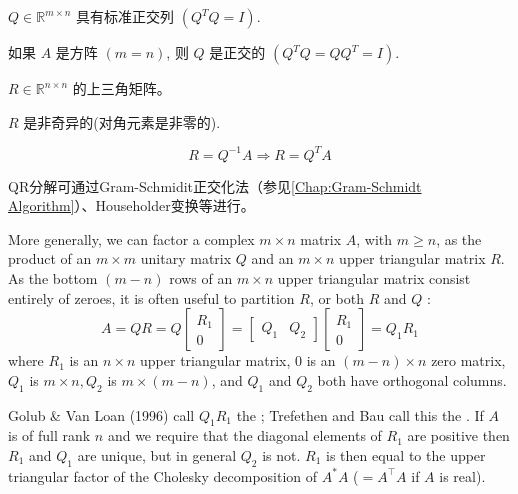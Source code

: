 \begin{corollary}
    $ Q \in \mathbb{R}^{m \times n} $ 具有标准正交列 $ \left(Q^{T} Q=I\right) $.
\end{corollary}

\begin{corollary}
    如果 $ A $ 是方阵 $ ( {m}= {n}) $, 则 $ Q $ 是正交的 $ \left(Q^{T} Q=Q Q^{T}=I\right) $.
\end{corollary}

\begin{corollary}
    $ R \in \mathbb{R}^{n \times n} $ 的上三角矩阵。
\end{corollary}

\begin{corollary}
     $ R $ 是非奇异的(对角元素是非零的).
\end{corollary}

\begin{corollary}
    $$ R=Q^{-1} A \Rightarrow R=Q^{T} A $$
\end{corollary}

QR分解可通过Gram-Schmidit正交化法（参见\ref{Chap:Gram-Schmidt Algorithm}）、Householder变换等进行。

More generally, we can factor a complex $ m \times n $ matrix $ A $, with $ m \geq n $, as the product of an $ m \times m $ unitary matrix $ Q $ and an $ m \times n $ upper triangular matrix $ R $. As the bottom $ (m-n) $ rows of an $ m \times n $ upper triangular matrix consist entirely of zeroes, it is often useful to partition $ R $, or both $ R $ and $ Q $ :
$$
A=Q R=Q\left[\begin{array}{c}
R_{1} \\
0
\end{array}\right]=\left[\begin{array}{ll}
Q_{1} & Q_{2}
\end{array}\right]\left[\begin{array}{c}
R_{1} \\
0
\end{array}\right]=Q_{1} R_{1}
$$
where $ R_{1} $ is an $ n \times n $ upper triangular matrix, 0 is an $ (m-n) \times n $ zero matrix, $ Q_{1} $ is $ m \times n, Q_{2} $ is $ m \times(m-n) $, and $ Q_{1} $ and $ Q_{2} $ both have orthogonal columns.

Golub \& Van Loan (1996) call $ Q_{1} R_{1} $ the ; Trefethen and Bau call this the .   If $ A $ is of full rank $ n $ and we require that the diagonal elements of $ R_{1} $ are positive then $ R_{1} $ and $ Q_{1} $ are unique, but in general $ Q_{2} $ is not. $ R_{1} $ is then equal to the upper triangular factor of the Cholesky decomposition of $ A^{*} A$ ($=A^{\top} A $ if $ A $ is real).


